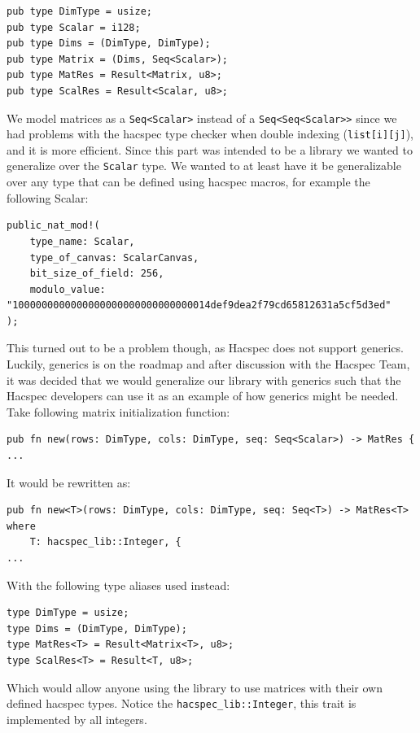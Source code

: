 \documentclass{article}
\begin{document}
\begin{lstlisting}
pub type DimType = usize;
pub type Scalar = i128;
pub type Dims = (DimType, DimType);
pub type Matrix = (Dims, Seq<Scalar>);
pub type MatRes = Result<Matrix, u8>;
pub type ScalRes = Result<Scalar, u8>;
\end{lstlisting}

We model matrices as a \texttt{Seq<Scalar>} instead of a
\texttt{Seq<Seq<Scalar>>} since we had problems with the hacspec type
checker when double indexing (\texttt{list[i][j]}), and it is more
efficient. Since this part was intended to be a library we wanted to
generalize over the \texttt{Scalar} type. We wanted to at least have
it be generalizable over any type that can be defined using hacspec
macros, for example the following Scalar:

\begin{lstlisting}
public_nat_mod!(
	type_name: Scalar,
	type_of_canvas: ScalarCanvas,
	bit_size_of_field: 256,
	modulo_value: "1000000000000000000000000000000014def9dea2f79cd65812631a5cf5d3ed"
);
\end{lstlisting}

This turned out to be a problem though, as Hacspec does not support
generics. Luckily, generics is on the roadmap and after discussion
with the Hacspec Team, it was decided that we would generalize our
library with generics such that the Hacspec developers can use it
as an example of how generics might be needed. Take following matrix
initialization function:

\begin{lstlisting}
pub fn new(rows: DimType, cols: DimType, seq: Seq<Scalar>) -> MatRes {
...
\end{lstlisting}

It would be rewritten as:

\begin{lstlisting}
pub fn new<T>(rows: DimType, cols: DimType, seq: Seq<T>) -> MatRes<T>
where
	T: hacspec_lib::Integer, {
...
\end{lstlisting}

With the following type aliases used instead:

\begin{lstlisting}
type DimType = usize;
type Dims = (DimType, DimType);
type MatRes<T> = Result<Matrix<T>, u8>;
type ScalRes<T> = Result<T, u8>;
\end{lstlisting}

Which would allow anyone using the library to use matrices with their
own defined hacspec types. Notice the \texttt{hacspec\_lib::Integer},
this trait is implemented by all integers.
\end{document}
